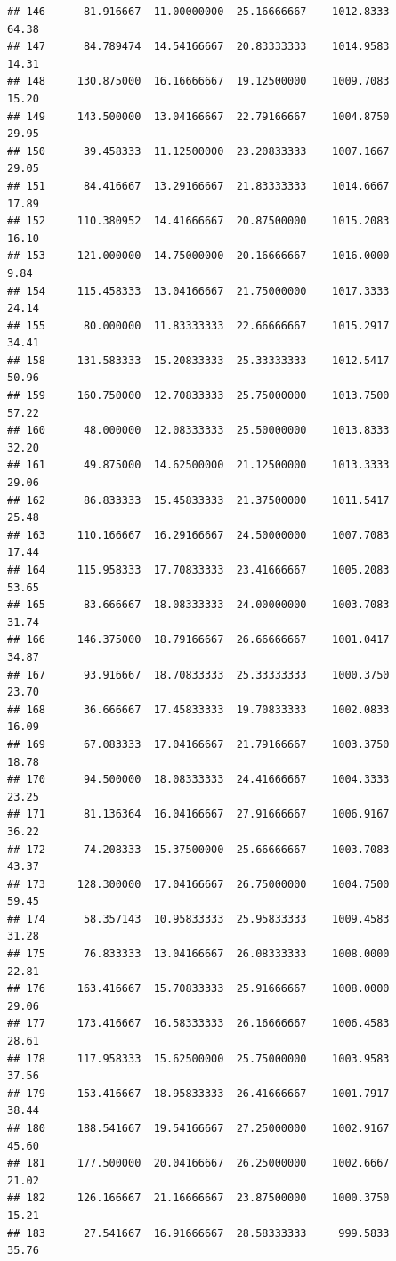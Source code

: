 \documentclass[
]{article}
\begin{document}
\begin{verbatim}
## 146      81.916667  11.00000000  25.16666667    1012.8333       64.38
## 147      84.789474  14.54166667  20.83333333    1014.9583       14.31
## 148     130.875000  16.16666667  19.12500000    1009.7083       15.20
## 149     143.500000  13.04166667  22.79166667    1004.8750       29.95
## 150      39.458333  11.12500000  23.20833333    1007.1667       29.05
## 151      84.416667  13.29166667  21.83333333    1014.6667       17.89
## 152     110.380952  14.41666667  20.87500000    1015.2083       16.10
## 153     121.000000  14.75000000  20.16666667    1016.0000        9.84
## 154     115.458333  13.04166667  21.75000000    1017.3333       24.14
## 155      80.000000  11.83333333  22.66666667    1015.2917       34.41
## 158     131.583333  15.20833333  25.33333333    1012.5417       50.96
## 159     160.750000  12.70833333  25.75000000    1013.7500       57.22
## 160      48.000000  12.08333333  25.50000000    1013.8333       32.20
## 161      49.875000  14.62500000  21.12500000    1013.3333       29.06
## 162      86.833333  15.45833333  21.37500000    1011.5417       25.48
## 163     110.166667  16.29166667  24.50000000    1007.7083       17.44
## 164     115.958333  17.70833333  23.41666667    1005.2083       53.65
## 165      83.666667  18.08333333  24.00000000    1003.7083       31.74
## 166     146.375000  18.79166667  26.66666667    1001.0417       34.87
## 167      93.916667  18.70833333  25.33333333    1000.3750       23.70
## 168      36.666667  17.45833333  19.70833333    1002.0833       16.09
## 169      67.083333  17.04166667  21.79166667    1003.3750       18.78
## 170      94.500000  18.08333333  24.41666667    1004.3333       23.25
## 171      81.136364  16.04166667  27.91666667    1006.9167       36.22
## 172      74.208333  15.37500000  25.66666667    1003.7083       43.37
## 173     128.300000  17.04166667  26.75000000    1004.7500       59.45
## 174      58.357143  10.95833333  25.95833333    1009.4583       31.28
## 175      76.833333  13.04166667  26.08333333    1008.0000       22.81
## 176     163.416667  15.70833333  25.91666667    1008.0000       29.06
## 177     173.416667  16.58333333  26.16666667    1006.4583       28.61
## 178     117.958333  15.62500000  25.75000000    1003.9583       37.56
## 179     153.416667  18.95833333  26.41666667    1001.7917       38.44
## 180     188.541667  19.54166667  27.25000000    1002.9167       45.60
## 181     177.500000  20.04166667  26.25000000    1002.6667       21.02
## 182     126.166667  21.16666667  23.87500000    1000.3750       15.21
## 183      27.541667  16.91666667  28.58333333     999.5833       35.76

\end{verbatim}
\end{document}
